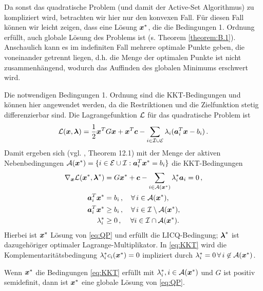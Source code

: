 Da sonst das quadratische Problem (und damit der Active-Set Algorithmus) zu kompliziert wird, betrachten wir hier nur den konvexen Fall. Für diesen Fall können wir leicht zeigen, dass eine Lösung $\boldsymbol x^*$, die die Bedingungen 1. Ordnung erfüllt, auch globale Lösung des Problems ist (s. Theorem \ref{theorem:B.1}). Anschaulich kann es im indefiniten Fall mehrere optimale Punkte geben, die voneinander getrennt liegen, d.h. die Menge der optimalen Punkte ist nicht zusammenhängend, wodurch das Auffinden des globalen Minimums erschwert wird.

Die notwendigen Bedingungen 1. Ordnung sind die KKT-Bedingungen und können hier angewendet werden, da die Restriktionen und die Zielfunktion stetig differenzierbar sind. Die Lagrangefunktion $\mathcal L$ für das quadratische Problem ist
\begin{align}
	\mathcal L(\boldsymbol x,\boldsymbol\lambda) = \frac 1 2 \boldsymbol x^T G \boldsymbol x + \boldsymbol x^T \boldsymbol c- \sum_{i \in \mathcal I \cup \mathcal E} \lambda_i (\boldsymbol a_i^T \boldsymbol x-b_i) \, .
\end{align}
Damit ergeben sich (vgl. \cite{NocWri}, Theorem 12.1) mit der Menge der aktiven Nebenbedingungen $\mathcal A(\boldsymbol x^*) = \{i\in \mathcal E \cup \mathcal I : \boldsymbol a_i^T \boldsymbol x^* = b_i\}$ die KKT-Bedingungen
\begin{align}\label{eq:KKT}
\begin{aligned}
	\nabla_{\boldsymbol x} \mathcal L(\boldsymbol x^*,\boldsymbol \lambda^*) & = G\boldsymbol x^*+\boldsymbol c-\sum_{i \in \mathcal A(\boldsymbol x^*)} \lambda^*_i \boldsymbol a_i  = 0 \, , \\
	\boldsymbol a_i^T \boldsymbol x^* &  = b_i \, , \quad \forall \, i \in \mathcal A(\boldsymbol x^*) , \\
	\boldsymbol a_i^T \boldsymbol x^* &  \ge b_i \, , \quad \forall \, i \in \mathcal I \setminus \mathcal A(\boldsymbol x^*) ,\\
	\lambda_i^* & \ge 0 \, , \quad \, \forall i \in \mathcal I \cap \mathcal A(\boldsymbol x^*) .
\end{aligned}
\end{align}
Hierbei ist $\boldsymbol x^*$ Lösung von \eqref{eq:QP} und erfüllt die LICQ-Bedingung; $\boldsymbol\lambda^*$ ist dazugehöriger optimaler Lagrange-Multiplikator. In \eqref{eq:KKT} wird die Komplementaritätsbedingung $\lambda^*_i c_i(\boldsymbol x^*) = 0$ impliziert durch $\lambda_i^* = 0 \, \forall \, i \not\in \mathcal A(\boldsymbol x^*)$.

\begin{theorem}\label{theorem:B.1}
Wenn $\boldsymbol x^*$ die Bedingungen \textnormal{\eqref{eq:KKT}} erfüllt mit $\lambda_i^*,i \in \mathcal A(\boldsymbol x^*)$ und $G$ ist positiv semidefinit, dann ist $\boldsymbol x^*$ eine globale Lösung von \textnormal{\eqref{eq:QP}}.
\end{theorem}


